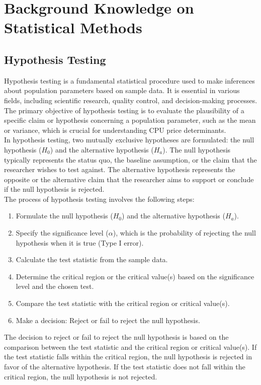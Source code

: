 \section{Background Knowledge on Statistical Methods}
\subsection{Hypothesis Testing}

Hypothesis testing is a fundamental statistical procedure used to make inferences about population parameters based on sample data. It is essential in various fields, including scientific research, quality control, and decision-making processes. The primary objective of hypothesis testing is to evaluate the plausibility of a specific claim or hypothesis concerning a population parameter, such as the mean or variance, which is crucial for understanding CPU price determinants.\\

In hypothesis testing, two mutually exclusive hypotheses are formulated: the null hypothesis ($H_0$) and the alternative hypothesis ($H_a$). The null hypothesis typically represents the status quo, the baseline assumption, or the claim that the researcher wishes to test against. The alternative hypothesis represents the opposite or the alternative claim that the researcher aims to support or conclude if the null hypothesis is rejected.\\

The process of hypothesis testing involves the following steps:
\begin{enumerate}
    \item Formulate the null hypothesis ($H_0$) and the alternative hypothesis ($H_a$).
    \item Specify the significance level ($\alpha$), which is the probability of rejecting the null hypothesis when it is true (Type I error).
    \item Calculate the test statistic from the sample data.
    \item Determine the critical region or the critical value(s) based on the significance level and the chosen test.
    \item Compare the test statistic with the critical region or critical value(s).
    \item Make a decision: Reject or fail to reject the null hypothesis.
\end{enumerate}

The decision to reject or fail to reject the null hypothesis is based on the comparison between the test statistic and the critical region or critical value(s). If the test statistic falls within the critical region, the null hypothesis is rejected in favor of the alternative hypothesis. If the test statistic does not fall within the critical region, the null hypothesis is not rejected.\\

